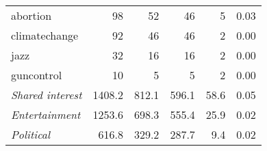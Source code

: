 \begin{tabular}{lrrrrr}
        abortion &     98 &     52 &            46 &                          5 &                                0.03 \\
   climatechange &     92 &     46 &            46 &                          2 &                                0.00 \\
            jazz &     32 &     16 &            16 &                          2 &                                0.00 \\
      guncontrol &     10 &      5 &             5 &                          2 &                                0.00 \\
\midrule
\textit{Shared interest} & 1408.2 & 812.1 &        596.1 &                      58.6 &                                0.05 \\
  \textit{Entertainment} & 1253.6 & 698.3 &        555.4 &                      25.9 &                                0.02 \\
      \textit{Political} &  616.8 & 329.2 &        287.7 &                       9.4 &                                0.02 \\
\bottomrule

\end{tabular}

